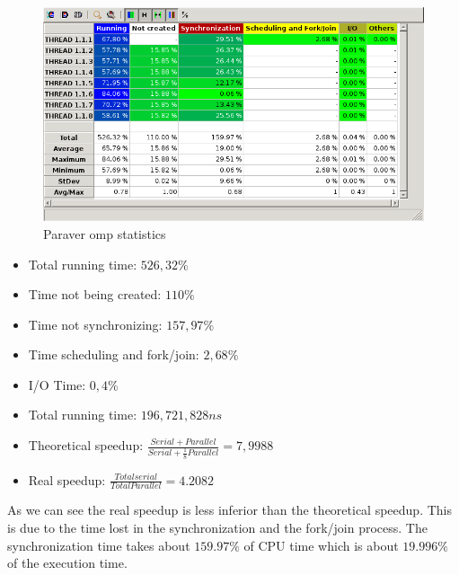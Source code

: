 \documentclass[a4paper]{article}
\begin{document}
\begin{figure}[H]
    \centering
    \includegraphics[width=\textwidth]{image04}
    \caption{Paraver omp statistics}
\end{figure}

\begin{itemize}
    \item Total running time: $526,32\%$
    \item Time not being created: $110\%$
    \item Time not synchronizing: $157,97\%$
    \item Time scheduling and fork/join: $2,68\%$
    \item I/O Time: $0,4\%$
\end{itemize}

\begin{itemize}
    \item Total running time: $196,721,828ns$
    \item Theoretical speedup: $ \frac{Serial + Parallel}{Serial + \frac{1}{8}Parallel} = 7,9988 $
    \item Real speedup: $\frac{Total serial}{Total Parallel} = 4.2082 $
\end{itemize}

As we can see the real speedup is less inferior than the theoretical speedup. This is due to the time lost in the synchronization and the fork/join process. The synchronization time takes about $159.97\%$ of CPU time which is about $19.996\%$ of the execution time.
\end{document}
